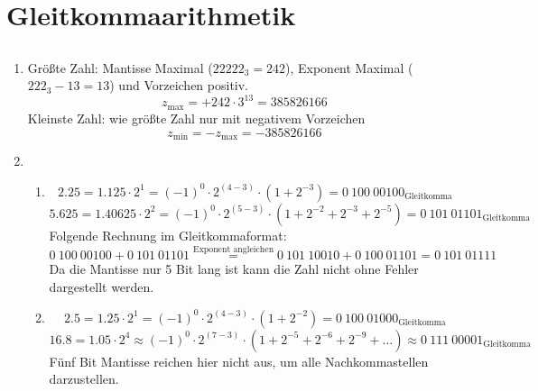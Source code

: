 \documentclass[DIN, pagenumber=false, fontsize=11pt, parskip=half]{scrartcl}
\begin{document}
    \section{Gleitkommaarithmetik}
    \setcounter{subsection}{2}
    \subsection{}
    \begin{enumerate}[label=(\alph*)]
        \item
            Größte Zahl: Mantisse Maximal (${22222}_3 = 242$), Exponent Maximal (${222}_3 - 13 = 13$) und Vorzeichen positiv.
            \begin{equation*}
                z_\text{max} = + 242 \cdot 3^{13} = 385826166 
            \end{equation*}
            Kleinste Zahl: wie größte Zahl nur mit negativem Vorzeichen
            \begin{equation*}
                z_\text{min} = - z_\text{max} = -385826166
            \end{equation*}
        \item 
            \begin{enumerate}[label=\roman*.]
                \item 
                    \begin{equation*}
                        2.25 = 1.125 \cdot 2^1 = (-1)^0 \cdot 2^{(4-3)} \cdot (1 + 2^{-3}) = {0\ 100\ 00100}_\text{Gleitkomma} 
                    \end{equation*}
                    \begin{equation*}
                        5.625 = 1.40625 \cdot 2^2 = (-1)^0 \cdot 2^{(5-3)} \cdot (1 + 2^{-2} + 2^{-3} + 2^{-5}) = {0\ 101\ 01101}_\text{Gleitkomma} 
                    \end{equation*}
                    Folgende Rechnung im Gleitkommaformat:
                    \begin{equation*}
                        0\ 100\ 00100 + 0\ 101\ 01101 \stackrel{\text{Exponent angleichen}}{=} 0\ 101\ 10010 + 0\ 100\ 01101 = 0\ 101\ 01111
                    \end{equation*}
                    Da die Mantisse nur 5 Bit lang ist kann die Zahl nicht ohne Fehler dargestellt werden.
                \item 
                    \begin{equation*}
                        2.5 = 1.25 \cdot 2^1 = (-1)^0 \cdot 2^{(4-3)} \cdot (1 + 2^{-2}) = {0\ 100\ 01000}_\text{Gleitkomma}
                    \end{equation*}
                    \begin{equation*}
                        16.8 = 1.05 \cdot 2^4 \approx (-1)^0 \cdot 2^{(7-3)} \cdot (1 + 2^{-5} + 2^{-6} + 2^{-9} + \ldots) 
                        \approx {0\ 111\ 00001}_\text{Gleitkomma}
                    \end{equation*}
                    Fünf Bit Mantisse reichen hier nicht aus, um alle Nachkommastellen darzustellen.


\end{enumerate}
\end{enumerate}
\end{document}
